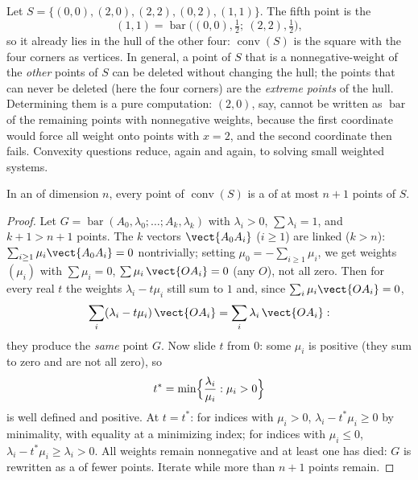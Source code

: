 \begin{example}\label{ex:b2:affine:squarehull}
Let $S = \{(0,0), (2,0), (2,2), (0,2), (1,1)\}$. The fifth
point is the 
\[
(1,1) = \operatorname{bar}\bigl((0,0), \tfrac12;\ (2,2),
\tfrac12\bigr),
\]
so it already lies in the hull of the other four:
$\operatorname{conv}(S)$ is the square with the four corners
as vertices. In general, a point of $S$ that is a
nonnegative-weight  of the \emph{other} points of
$S$ can be deleted without changing the hull; the points that
can never be deleted (here the four corners) are the
\emph{extreme points} of the hull. Determining them is a pure
 computation: $(2,0)$, say, cannot be written as
$\operatorname{bar}$ of the remaining points with nonnegative
weights, because the first coordinate would force all weight
onto points with $x = 2$, and the second coordinate then
fails. Convexity questions reduce, again and again, to
solving small weighted systems.
\end{example}

\begin{theorem}[Carathéodory]\label{thm:b2:affine:caratheodory}
In an  of dimension $n$, every point of
$\operatorname{conv}(S)$ is a  of at most $n + 1$ points
of $S$.
\end{theorem}

\begin{proof}
Let $G = \operatorname{bar}(A_0, \lambda_0; \dots; A_k, \lambda_k)$
with $\lambda_i > 0$, $\sum\lambda_i = 1$, and $k + 1 > n + 1$
points. The $k$ vectors $\vect{A_0A_i}$ ($i \geq 1$) are linked
($k > n$): $\sum_{i\geq1}\mu_i \vect{A_0A_i} = 0$ nontrivially;
setting $\mu_0 = -\sum_{i\geq1}\mu_i$, we get weights $(\mu_i)$
with $\sum\mu_i = 0$, $\sum \mu_i\,\vect{OA_i} = 0$ (any $O$), not
all zero. Then for every real $t$ the weights $\lambda_i - t\mu_i$
still sum to $1$ and, since $\sum_i\mu_i\vect{OA_i} = 0$,
\[
\sum_i(\lambda_i - t\mu_i)\,\vect{OA_i}
= \sum_i\lambda_i\,\vect{OA_i} :
\]
they produce the \emph{same} point $G$. Now slide $t$ from
$0$: some $\mu_i$ is positive (they sum to zero and are not
all zero), so
\[
t^* = \min\Bigl\{\frac{\lambda_i}{\mu_i} : \mu_i > 0\Bigr\}
\]
is well defined and positive. At $t = t^*$: for indices with
$\mu_i > 0$, $\lambda_i - t^*\mu_i \geq 0$ by minimality,
with equality at a minimizing index; for indices with $\mu_i
\leq 0$, $\lambda_i - t^*\mu_i \geq \lambda_i > 0$. All
weights remain nonnegative and at least one has died: $G$ is
rewritten as a  of fewer points. Iterate while more
than $n + 1$ points remain.
\end{proof}

